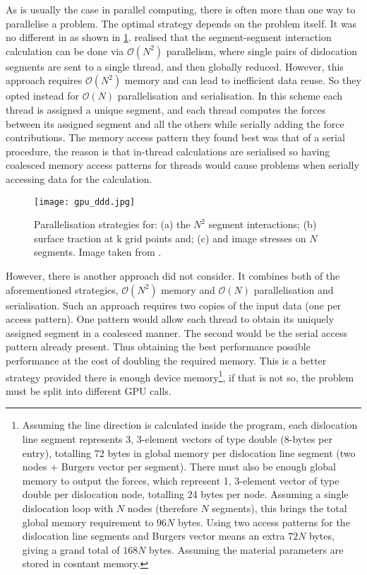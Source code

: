 As is usually the case in parallel computing, there is often more than one way to parallelise a problem. The optimal strategy depends on the problem itself. It was no different in \cite{gpu_ddd} as shown in \cref{f:gpu_ddd}.  realised that the segment-segment interaction calculation can be done via $ \mathcal{O}(N^{2}) $ parallelism, where single pairs of dislocation segments are sent to a single thread, and then globally reduced. However, this approach requires $ \mathcal{O}(N^{2}) $ memory and can lead to inefficient data reuse. So they opted instead for $ \mathcal{O}(N) $ parallelisation and serialisation. In this scheme each thread is assigned a unique segment, and each thread computes the forces between its assigned segment and all the others while serially adding the force contributions. The memory access pattern they found best was that of a serial procedure, the reason is that in-thread calculations are serialised so having coalesced memory access patterns for threads would cause problems when serially accessing data for the calculation.
\begin{figure}[t]
    \centering
    \texttt{[image: gpu\_ddd.jpg]}
    \caption[Parallelisation strategies for three problems in 3D DDD.]{Parallelisation strategies for: (a) the $ N^{2} $ segment interactions; (b) surface traction at k grid points and; (c) and image stresses on $ N $ segments. Image taken from \cite{gpu_ddd}.}
    \label{f:gpu_ddd}
\end{figure}

However, there is another approach \citet{gpu_ddd} did not consider. It combines both of the aforementioned strategies, $ \mathcal{O}(N^{2}) $ memory and $ \mathcal{O}(N) $ parallelisation and serialisation. Such an approach requires two copies of the input data (one per access pattern). One pattern would allow each thread to obtain its uniquely assigned segment in a coalesced manner. The second would be the serial access pattern already present. Thus obtaining the best performance possible performance at the cost of doubling the required memory. This is a better strategy provided there is enough device memory\footnote{Assuming the line direction is calculated inside the program, each dislocation line segment represents 3, 3-element vectors of type double (8-bytes per entry), totalling 72 bytes in global memory per dislocation line segment (two nodes + Burgers vector per segment). There must also be enough global memory to output the forces, which represent 1, 3-element vector of type double per dislocation node, totalling 24 bytes per node. Assuming a single dislocation loop with $ N $ nodes (therefore $ N $ segments), this brings the total global memory requirement to $ 96N $ bytes. Using two access patterns for the dislocation line segments and Burgers vector means an extra $ 72N $ bytes, giving a grand total of $ 168N $ bytes. Assuming the material parameters are stored in cosntant memory.}, if that is not so, the problem must be split into different GPU calls.


